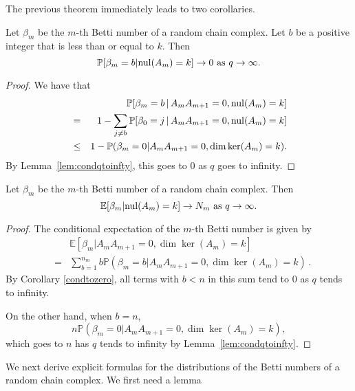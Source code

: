   



The previous theorem immediately leads to two corollaries.  

\begin{corollary}\label{condtozero}
Let $\beta_m$ be the $m$-th Betti number of a random chain complex. Let $b$ be a positive integer that is less than or equal to $k$. Then 
\[
\mathbb{P}[\beta_m = b| \mathrm{nul}(A_{m}) = k ] \to 0 \textrm{ as } q\to\infty.
\]
\end{corollary}
\begin{proof}
We have that
	\begin{eqnarray*}
	&&\mathbb{P}[\beta_m = b \,|\, A_{m}A_{m+1} = 0, \mathrm{nul}(A_{m}) = k ]\\
    &=& 1 - \sum_{j\neq b}\mathbb{P}[\beta_0 = j \,|\, A_{m}A_{m+1} = 0, \mathrm{nul}(A_{m}) = k ]\\
    &\leq& 1 - \mathbb{P}(\beta_m = 0|A_{m}A_{m+1} = 0, \dim\ker(A_{m}) = k ).
	\end{eqnarray*}
By Lemma~\ref{lem:condqtoinfty}, this goes to $0$ as $q$ goes to infinity.
\end{proof}

\begin{corollary}
Let $\beta_m$ be the $m$-th Betti number of a random chain complex.  Then 
\[
\mathbb{E}[\beta_m | \mathrm{nul}(A_{m}) = k ] \to  N_m\textrm{ as } q\to\infty.
\]
\begin{proof}
The conditional expectation of the $m$-th Betti number is given by
	\begin{eqnarray*}
	& & \mathbb{E}[\beta_m | A_{m}A_{m+1} = 0, \dim\ker(A_{m}) = k ]\\
	&=& \sum_{b=1}^{n_m} b \mathbb{P}(\beta_m = b | A_{m}A_{m+1} = 0, \dim\ker(A_{m}) = k ) \, .
	\end{eqnarray*}
By Corollary \ref{condtozero}, all terms with $b< n$ in this sum tend to 
$0$ as $q$ tends to infinity. 

On the other hand, when $b=n$, 
\[
n\mathbb{P}(\beta_m=0| A_{m}A_{m+1} = 0, \dim\ker(A_{m}) = k ),
\]
which goes to $n$ has $q$ tends to infinity by Lemma~\ref{lem:condqtoinfty}.
\end{proof}
\end{corollary}

We next derive explicit formulas for the distributions of the Betti numbers of a random chain complex. We first need a lemma

